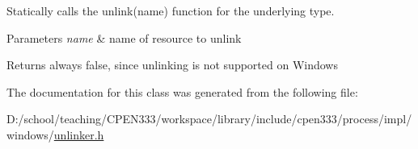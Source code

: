 Statically calls the {\ttfamily unlink(name)} function for the underlying type. 


\begin{DoxyParams}{Parameters}
{\em name} & name of resource to unlink \\
\hline
\end{DoxyParams}
\begin{DoxyReturn}{Returns}
always {\ttfamily false}, since unlinking is not supported on Windows 
\end{DoxyReturn}


The documentation for this class was generated from the following file\+:\begin{DoxyCompactItemize}
\item 
D\+:/school/teaching/\+C\+P\+E\+N333/workspace/library/include/cpen333/process/impl/windows/\hyperlink{impl_2windows_2unlinker_8h}{unlinker.\+h}\end{DoxyCompactItemize}

